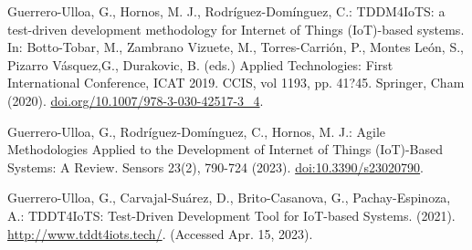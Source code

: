 \documentclass{svproc}
\begin{document}
\begin{thebibliography}{6}
Guerrero-Ulloa, G., Hornos, M. J., Rodr\'{i}guez-Dom\'{i}nguez, C.: TDDM4IoTS: a
test-driven development methodology for Internet of Things (IoT)-based systems.
In: Botto-Tobar, M., Zambrano Vizuete, M., Torres-Carri\'{o}n, P., Montes Le\'{o}n,
S., Pizarro V\'{a}squez,G., Durakovic, B. (eds.) Applied Technologies: First International
Conference, ICAT 2019. CCIS, vol 1193, pp. 41?45. Springer, Cham (2020).
\url{doi.org/10.1007/978-3-030-42517-3_4}.

Guerrero-Ulloa, G., Rodr\'{i}guez-Dom\'{i}nguez, C., Hornos, M. J.: Agile Methodologies
Applied to the Development of Internet of Things (IoT)-Based Systems: A Review.
Sensors 23(2), 790-724 (2023). \url{doi:10.3390/s23020790}.

Guerrero-Ulloa, G., Carvajal-Su\'{a}rez, D., Brito-Casanova, G., Pachay-Espinoza, A.:
TDDT4IoTS: Test-Driven Development Tool for IoT-based Systems. (2021). \url{http://www.tddt4iots.tech/}. (Accessed Apr. 15, 2023).

\end{thebibliography}
\end{document}

